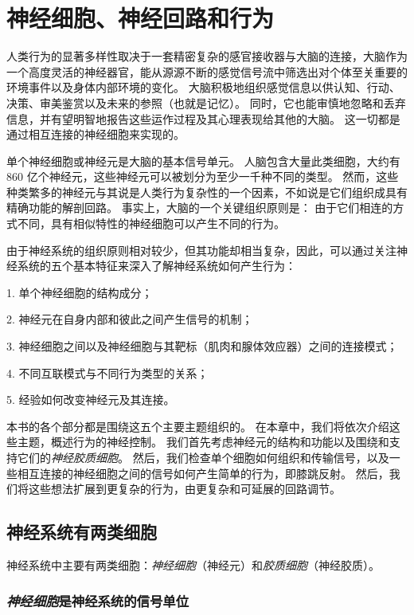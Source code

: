 \chapter{神经细胞、神经回路和行为} \label{chap:chap3}



人类行为的显著多样性取决于一套精密复杂的感官接收器与大脑的连接，大脑作为一个高度灵活的神经器官，能从源源不断的感觉信号流中筛选出对个体至关重要的环境事件以及身体内部环境的变化。
大脑积极地组织感觉信息以供认知、行动、决策、审美鉴赏以及未来的参照（也就是记忆）。
同时，它也能审慎地忽略和丢弃信息，并有望明智地报告这些运作过程及其心理表现给其他的大脑。
这一切都是通过相互连接的神经细胞来实现的。


单个神经细胞或神经元是大脑的基本信号单元。 
人脑包含大量此类细胞，大约有 860 亿个神经元，这些神经元可以被划分为至少一千种不同的类型。 
然而，这些种类繁多的神经元与其说是人类行为复杂性的一个因素，不如说是它们组织成具有精确功能的解剖回路。 
事实上，大脑的一个关键组织原则是：
由于它们相连的方式不同，具有相似特性的神经细胞可以产生不同的行为。


由于神经系统的组织原则相对较少，但其功能却相当复杂，因此，可以通过关注神经系统的五个基本特征来深入了解神经系统如何产生行为：

1. 单个神经细胞的结构成分；

2. 神经元在自身内部和彼此之间产生信号的机制；

3. 神经细胞之间以及神经细胞与其靶标（肌肉和腺体效应器）之间的连接模式；

4. 不同互联模式与不同行为类型的关系；

5. 经验如何改变神经元及其连接。


本书的各个部分都是围绕这五个主要主题组织的。 
在本章中，我们将依次介绍这些主题，概述行为的神经控制。
我们首先考虑神经元的结构和功能以及围绕和支持它们的\textit{神经胶质细胞}。
然后，我们检查单个细胞如何组织和传输信号，以及一些相互连接的神经细胞之间的信号如何产生简单的行为，即膝跳反射。
然后，我们将这些想法扩展到更复杂的行为，由更复杂和可延展的回路调节。



\section{神经系统有两类细胞}

神经系统中主要有两类细胞：\textit{神经细胞}（神经元）和\textit{胶质细胞}（神经胶质）。


\subsection{\textit{神经细胞}是神经系统的信号单位}

